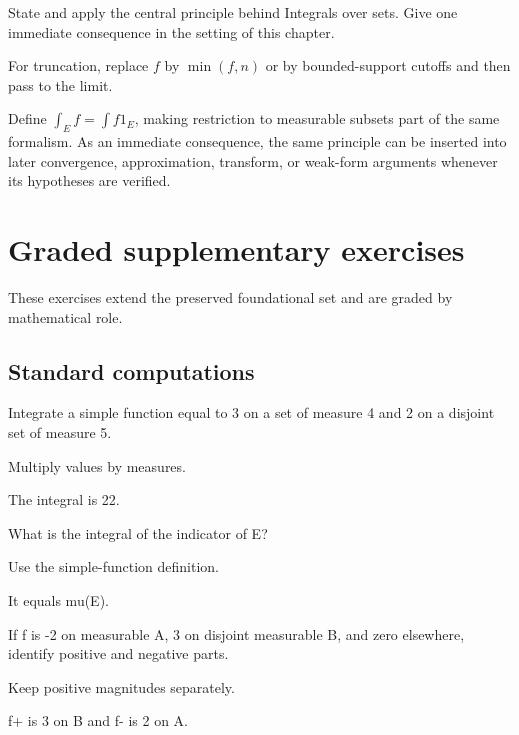 \begin{exercise}\label{exr:iii03-08}
State and apply the central principle behind Integrals over sets. Give one immediate consequence in the setting of this chapter.
\end{exercise}
\begin{hint}
For truncation, replace \(f\) by \(\min(f,n)\) or by bounded-support cutoffs and then pass to the limit.
\end{hint}
\begin{solution}
Define $\int_Ef=\int f1_E$, making restriction to measurable subsets part of the same formalism. As an immediate consequence, the same principle can be inserted into later convergence, approximation, transform, or weak-form arguments whenever its hypotheses are verified.
\end{solution}


\section{Graded supplementary exercises}
These exercises extend the preserved foundational set and are graded by mathematical role.

\subsection*{Standard computations}

\begin{exercise}\label{exr:iii03-expand-01}
Integrate a simple function equal to 3 on a set of measure 4 and 2 on a disjoint set of measure 5.
\end{exercise}
\begin{hint}
Multiply values by measures.
\end{hint}
\begin{solution}
The integral is 22.
\end{solution}

\begin{exercise}[Indicator]\label{exr:iii03-expand-02}
What is the integral of the indicator of E?
\end{exercise}
\begin{hint}
Use the simple-function definition.
\end{hint}
\begin{solution}
It equals mu(E).
\end{solution}

\begin{exercise}\label{exr:iii03-expand-03}
If f is -2 on measurable A, 3 on disjoint measurable B, and zero elsewhere, identify positive and negative parts.
\end{exercise}
\begin{hint}
Keep positive magnitudes separately.
\end{hint}
\begin{solution}
f+ is 3 on B and f- is 2 on A.
\end{solution}

